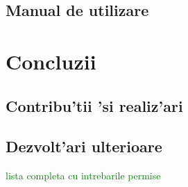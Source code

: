 \documentclass[12pt,a4paper,twoside]{report}
\begin{document}
\section{Manual de utilizare}



\chapter{Concluzii}

\section{Contribu'tii 'si realiz'ari}
\section{Dezvolt'ari ulterioare}


 



\textcolor{green}{lista completa cu intrebarile permise}
\end{document}
